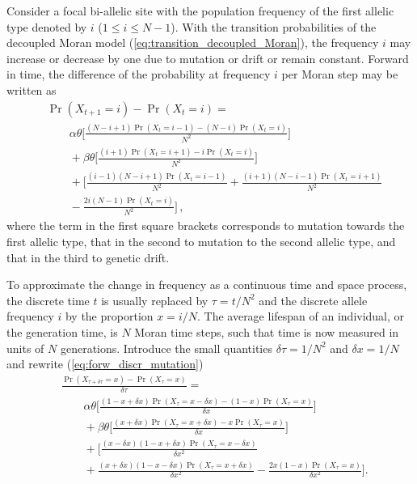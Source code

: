 \documentclass[preprint]{elsarticle}
\newcommand\x[1]{\ensuremath{X_{#1}}}
\begin{document}
Consider a focal bi-allelic site with the population frequency of the first allelic type denoted by $i$ ($1 \leq i \leq N-1$). With  the transition probabilities of the decoupled Moran model (\ref{eq:transition_decoupled_Moran}), the frequency $i$ may increase or decrease by one due to mutation or drift or remain constant. Forward in time, the difference of the probability at frequency $i$ per Moran step may be written as
\begin{equation}\label{eq:forw_discr_mutation}
\begin{split}
&\Pr(\x{t+1}=i)-\Pr(\x{t}=i) = \\
&\qquad\alpha\theta \bigg[\frac{(N-i+1)\Pr(\x{t}=i-1) - (N-i)\Pr(\x{t}=i)}{N^2}\bigg]\\
&\qquad+\beta\theta \bigg[\frac{(i+1)\Pr(\x{t}=i+1) - i\Pr(\x{t}=i)}{N^2}\bigg]\\
&\qquad+\bigg[\frac{(i-1)(N-i+1)\Pr(\x{t}=i-1)}{N^2}+ \frac{(i+1)(N-i-1)\Pr(\x{t}=i+1)}{N^2}\\
&\qquad-\frac{2i(N-1)\Pr(\x{t}=i)}{N^2}\bigg]\,,
\end{split}
\end{equation}
where the term in the first square brackets corresponds to mutation towards the first allelic type, that in the second to mutation to the second allelic type, and that in the third to genetic drift.

To approximate the change in frequency as a continuous time and space process, the discrete time $t$ is usually replaced by $\tau = t/N^2$ and the discrete allele frequency $i$ by the proportion $x=i/N$. The average lifespan of an individual, or the generation time, is $N$ Moran time steps, such that time is now measured in units of $N$ generations. Introduce the small quantities $\delta \tau=1/N^2$ and $\delta x=1/N$ and rewrite (\ref{eq:forw_discr_mutation})
\begin{equation}\label{eq:forw_cont_mutation}
\begin{split}
&\frac{\Pr(\x{\tau+\delta \tau}=x)-\Pr(\x{\tau}=x)}{\delta \tau} =\\ &\qquad\alpha\theta \bigg[\frac{(1-x+\delta x)\Pr(\x{\tau}=x-\delta x) - (1-x)\Pr(\x{\tau}=x)}{\delta x}\bigg]\\
&\qquad+\beta\theta \bigg[\frac{(x+\delta x)\Pr(\x{\tau}=x+\delta x) - x\Pr(\x{\tau}=x)}{\delta x}\bigg]\\
&\qquad+\bigg[\frac{(x-\delta x)(1-x+\delta x)\Pr(\x{\tau}=x-\delta x)}{\delta x^2}\\
&\qquad+ \frac{(x+\delta x)(1-x-\delta x)\Pr(\x{\tau}=x+\delta x)}{\delta x^2}-\frac{2x(1-x)\Pr(\x{\tau}=x)}{\delta x^2}\bigg].\\
\end{split}
\end{equation}
\end{document}
